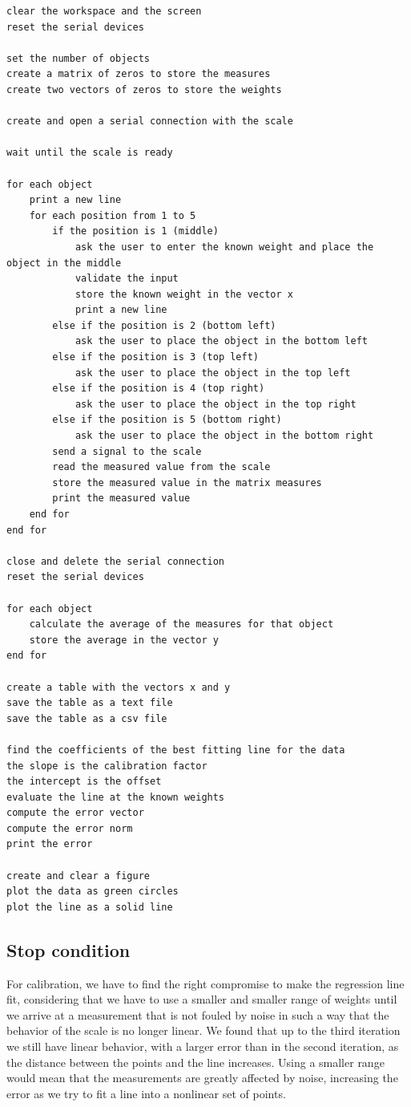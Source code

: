 \begin{verbatim}
clear the workspace and the screen
reset the serial devices

set the number of objects
create a matrix of zeros to store the measures
create two vectors of zeros to store the weights

create and open a serial connection with the scale

wait until the scale is ready

for each object
    print a new line
    for each position from 1 to 5
        if the position is 1 (middle)
            ask the user to enter the known weight and place the object in the middle
            validate the input
            store the known weight in the vector x
            print a new line
        else if the position is 2 (bottom left)
            ask the user to place the object in the bottom left
        else if the position is 3 (top left)
            ask the user to place the object in the top left
        else if the position is 4 (top right)
            ask the user to place the object in the top right
        else if the position is 5 (bottom right)
            ask the user to place the object in the bottom right
        send a signal to the scale
        read the measured value from the scale
        store the measured value in the matrix measures
        print the measured value
    end for
end for

close and delete the serial connection
reset the serial devices

for each object
    calculate the average of the measures for that object
    store the average in the vector y
end for

create a table with the vectors x and y
save the table as a text file
save the table as a csv file

find the coefficients of the best fitting line for the data
the slope is the calibration factor
the intercept is the offset
evaluate the line at the known weights
compute the error vector
compute the error norm
print the error

create and clear a figure
plot the data as green circles
plot the line as a solid line
\end{verbatim}

\subsection{Stop condition}

For calibration, we have to find the right compromise to make the regression line fit, considering that we have to use a smaller and smaller range of weights until we arrive at a measurement that is not fouled by noise in such a way that the behavior of the scale is no longer linear. We found that up to the third iteration we still have linear behavior, with a larger error than in the second iteration, as the distance between the points and the line increases. Using a smaller range would mean that the measurements are greatly affected by noise, increasing the error as we try to fit a line into a nonlinear set of points.

